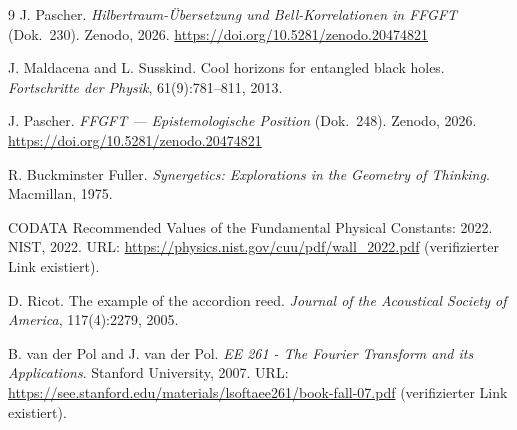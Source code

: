 	\begin{thebibliography}{9}
	J. Pascher.
	\newblock \emph{Hilbertraum-Übersetzung und Bell-Korrelationen in FFGFT} (Dok.~230).
	\newblock Zenodo, 2026.
	\newblock \url{https://doi.org/10.5281/zenodo.20474821}

	J. Maldacena and L. Susskind.
	\newblock Cool horizons for entangled black holes.
	\newblock \emph{Fortschritte der Physik}, 61(9):781--811, 2013.

	J. Pascher.
	\newblock \emph{FFGFT --- Epistemologische Position} (Dok.~248).
	\newblock Zenodo, 2026.
	\newblock \url{https://doi.org/10.5281/zenodo.20474821}

		R. Buckminster Fuller.
		\newblock \emph{Synergetics: Explorations in the Geometry of Thinking}.
		\newblock Macmillan, 1975.
		
		CODATA Recommended Values of the Fundamental Physical Constants: 2022.
		\newblock NIST, 2022.
		\newblock URL: \url{https://physics.nist.gov/cuu/pdf/wall_2022.pdf}
		(verifizierter Link existiert).
		
		D. Ricot.
		\newblock The example of the accordion reed.
		\newblock \emph{Journal of the Acoustical Society of America}, 117(4):2279, 2005.
		
		B. van der Pol and J. van der Pol.
		\newblock \emph{EE 261 - The Fourier Transform and its Applications}.
		\newblock Stanford University, 2007.
		\newblock URL: \url{https://see.stanford.edu/materials/lsoftaee261/book-fall-07.pdf}
		(verifizierter Link existiert).
	\end{thebibliography}